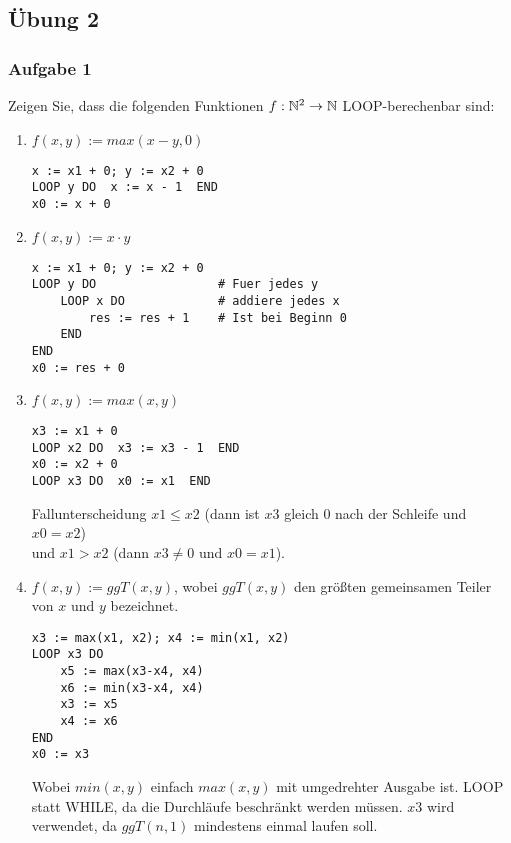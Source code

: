 
\subsection*{Übung 2}
\subsubsection*{Aufgabe 1}
Zeigen Sie, dass die folgenden Funktionen $f: \mathbb{N}^{2} \to \mathbb{N}$ LOOP-berechenbar sind:

    \begin{enumerate}
        \item $f(x,y) := max(x-y, 0)$
            \begin{lstlisting}
x := x1 + 0; y := x2 + 0
LOOP y DO  x := x - 1  END
x0 := x + 0
            \end{lstlisting}

        \item $f(x,y) := x \cdot y$
            \begin{lstlisting}
x := x1 + 0; y := x2 + 0
LOOP y DO                 # Fuer jedes y
    LOOP x DO             # addiere jedes x
        res := res + 1    # Ist bei Beginn 0
    END
END
x0 := res + 0
            \end{lstlisting}

        \item $f(x,y) := max(x,y)$
            \begin{lstlisting}
x3 := x1 + 0
LOOP x2 DO  x3 := x3 - 1  END
x0 := x2 + 0
LOOP x3 DO  x0 := x1  END
            \end{lstlisting}

            Fallunterscheidung $x1 \leq x2$ (dann ist $x3$ gleich $0$ nach der Schleife und $x0 = x2$) \\ und $x1 > x2$ (dann $x3 \neq 0$ und $x0 = x1$).

        \item $f(x,y) := ggT(x,y)$, wobei $ggT(x,y)$ den größten gemeinsamen Teiler von $x$ und $y$ bezeichnet.
            \begin{lstlisting}
x3 := max(x1, x2); x4 := min(x1, x2)
LOOP x3 DO
    x5 := max(x3-x4, x4)
    x6 := min(x3-x4, x4)
    x3 := x5
    x4 := x6
END
x0 := x3
            \end{lstlisting}

            Wobei $min(x,y)$ einfach $max(x, y)$ mit umgedrehter Ausgabe ist. LOOP statt WHILE, da die Durchläufe beschränkt werden müssen. $x3$ wird verwendet, da $ggT(n,1)$ mindestens einmal laufen soll.
    \end{enumerate}


